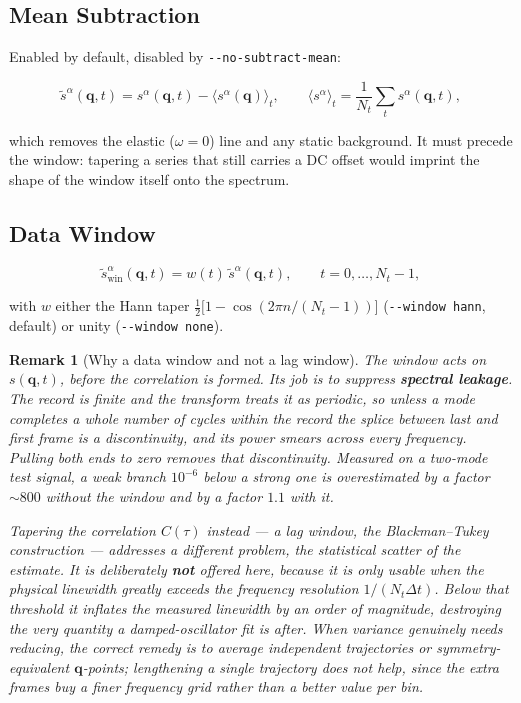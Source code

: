 \documentclass[12pt, a4paper, oneside]{article}
\newtheorem{remark}[theorem]{Remark}
\newcommand{\qvec}{\mathbf{q}}
\newcommand{\Nt}{N_t}
\begin{document}
\subsection{Mean Subtraction}

Enabled by default, disabled by \texttt{-\/-no-subtract-mean}:

\begin{equation}
    \tilde s^\alpha(\qvec,t) = s^\alpha(\qvec,t) - \langle s^\alpha(\qvec)\rangle_t,
    \qquad
    \langle s^\alpha\rangle_t = \frac{1}{\Nt}\sum_{t} s^\alpha(\qvec,t),
\end{equation}

which removes the elastic ($\omega = 0$) line and any static background. It must
precede the window: tapering a series that still carries a DC offset would
imprint the shape of the window itself onto the spectrum.

\subsection{Data Window}
\label{sec:window}

\begin{equation}
\boxed{
    \tilde s^\alpha_{\text{win}}(\qvec,t) = w(t)\,\tilde s^\alpha(\qvec,t),
    \qquad t = 0,\dots,\Nt-1,
}
\label{eq:window}
\end{equation}

with $w$ either the Hann taper $\tfrac12\bigl[1-\cos(2\pi n/(\Nt-1))\bigr]$
(\texttt{-\/-window hann}, default) or unity (\texttt{-\/-window none}).

\begin{remark}[Why a data window and not a lag window]
The window acts on $s(\qvec,t)$, \emph{before} the correlation is formed. Its
job is to suppress \textbf{spectral leakage}. The record is finite and the
transform treats it as periodic, so unless a mode completes a whole number of
cycles within the record the splice between last and first frame is a
discontinuity, and its power smears across every frequency. Pulling both ends to
zero removes that discontinuity. Measured on a two-mode test signal, a weak
branch $10^{-6}$ below a strong one is overestimated by a factor $\sim 800$
without the window and by a factor $1.1$ with it.

Tapering the correlation $C(\tau)$ instead --- a lag window, the
Blackman--Tukey construction --- addresses a different problem, the statistical
scatter of the estimate. It is deliberately \textbf{not} offered here, because
it is only usable when the physical linewidth greatly exceeds the frequency
resolution $1/(\Nt\Delta t)$. Below that threshold it inflates the measured
linewidth by an order of magnitude, destroying the very quantity a
damped-oscillator fit is after. When variance genuinely needs reducing, the
correct remedy is to average independent trajectories or symmetry-equivalent
$\qvec$-points; lengthening a single trajectory does not help, since the extra
frames buy a finer frequency grid rather than a better value per bin.
\end{remark}
\end{document}
